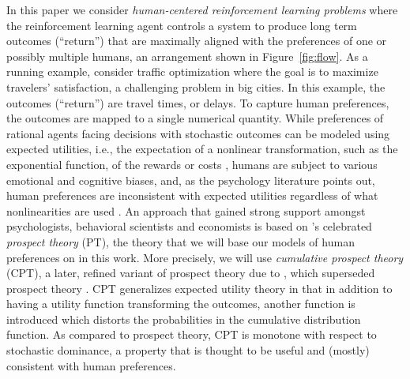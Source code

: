 In this paper we consider \emph{human-centered reinforcement learning problems}
where the  reinforcement learning agent controls a system 
to produce long term outcomes (``return'') that are maximally aligned with the preferences of 
one or possibly multiple humans, an arrangement shown in Figure~\ref{fig:flow}.
As a running example, consider traffic optimization where the goal is to maximize
travelers' satisfaction, a challenging problem 
in big cities.
In this example, the outcomes (``return'') are travel times, or delays. 
To capture human preferences, the outcomes are mapped to a single numerical quantity.
While preferences of rational agents facing decisions with stochastic outcomes can be modeled using expected utilities,
i.e., the expectation of a nonlinear transformation, such as the exponential function, of the rewards or costs
\citep{NeuMo44,fishburn1970expectedutility}, 
	humans are subject to various emotional and cognitive biases,
	and, as the psychology literature points out, human preferences 
	are inconsistent with expected utilities regardless of what nonlinearities are used
	 \citep{allais53,ellsberg61,kahneman1979prospect}.
An approach that gained 
	strong support amongst psychologists, behavioral scientists and economists  \citep[e.g.,][]{starmer2000developments,quiggin2012generalized}
	is based on \cite{kahneman1979prospect}'s celebrated \emph{prospect theory} (PT),
	the theory that we will base our models of human preferences on
	 in this work.
More precisely, we will use \emph{cumulative prospect theory} (CPT),
 	a later, refined variant of prospect theory due to \citet{tversky1992advances}, 
	which superseded prospect theory \citep[e.g.,][]{Barberis:2012vs}.
CPT generalizes expected utility theory in that in addition to having a utility function transforming
	the outcomes, another function is introduced which distorts the probabilities in the cumulative distribution function.
As compared to prospect theory, CPT is monotone with respect to stochastic dominance, a property
	that is thought to be useful and (mostly) consistent with human preferences.
	
